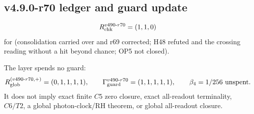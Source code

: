\subsection*{v4.9.0-r70 ledger and guard update}
\label{subsec:v490-r70-ledger-guard}

\[
R_{\rm chk}^{v490\text{-}r70}=(1,1,0)
\]
for (consolidation carried over and r69 corrected; H48 refuted and the crossing reading without a hit beyond chance; OP5 not closed).

The layer spends no guard:
\[
R_{\rm glob}^{(v490\text{-}r70,+)}=(0,1,1,1,1),
\qquad
\Gamma_{\rm guard}^{v490\text{-}r70}=(1,1,1,1,1),
\qquad
\beta_4=1/256\ \text{unspent}.
\]
It does not imply exact finite \(C5\) zero closure, exact all-readout terminality,
\(C6/T2\), a global photon-clock/RH theorem, or global all-readout closure.
